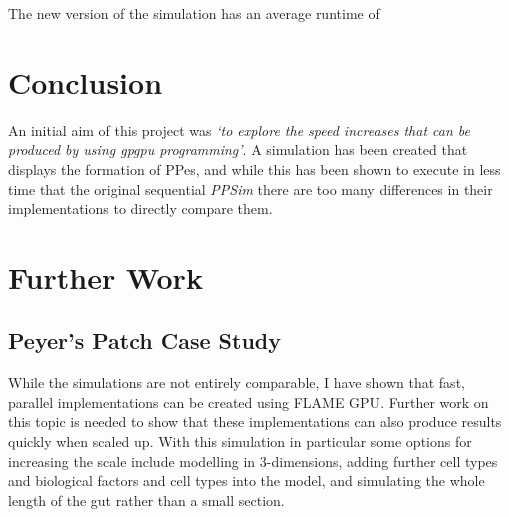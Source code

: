 \documentclass{UoYCSproject}
\begin{document}
The new version of the simulation has an average runtime of 


\section{Conclusion}


An initial aim of this project was \textit{`to explore the speed increases that can be produced by using \gls{gpgpu} programming'}.
A simulation has been created that displays the formation of \gls{PP}es, and while this has been shown to execute in less time that the original sequential \textit{PPSim} there are too many differences in their implementations to directly compare them.


\section{Further Work}
\subsection{Peyer's Patch Case Study}
While the simulations are not entirely comparable, I have shown that fast, parallel implementations can be created using \gls{FLAME GPU}.
Further work on this topic is needed to show that these implementations can also produce results quickly when scaled up.
With this simulation in particular some options for increasing the scale include modelling in 3-dimensions, adding further cell types and biological factors and cell types into the model, and simulating the whole length of the gut rather than a small section.
\end{document}
